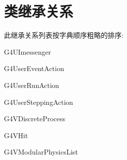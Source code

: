\section{类继承关系}
此继承关系列表按字典顺序粗略的排序\+: \begin{DoxyCompactList}
\item G4\+U\+Imessenger\begin{DoxyCompactList}
\item {}
\end{DoxyCompactList}
\item G4\+User\+Event\+Action\begin{DoxyCompactList}
\item {}
\end{DoxyCompactList}
\item G4\+User\+Run\+Action\begin{DoxyCompactList}
\item {}
\end{DoxyCompactList}
\item G4\+User\+Stepping\+Action\begin{DoxyCompactList}
\item {}
\end{DoxyCompactList}
\item G4\+V\+Discrete\+Process\begin{DoxyCompactList}
\item {}
\end{DoxyCompactList}
\item G4\+V\+Hit\begin{DoxyCompactList}
\item {}
\item {}
\end{DoxyCompactList}
\item G4\+V\+Modular\+Physics\+List\begin{DoxyCompactList}
\item {}
\end{DoxyCompactList}

\end{DoxyCompactList}
